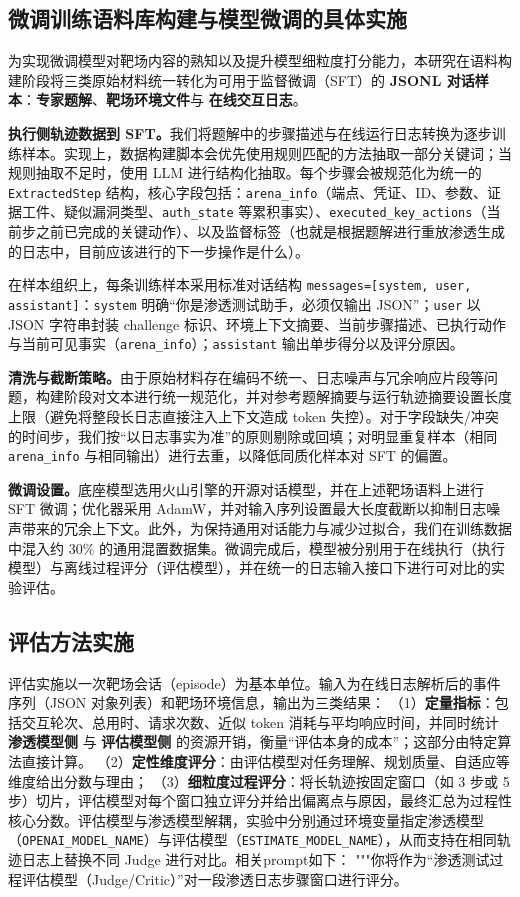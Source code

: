 \documentclass[a4paper, twocolumn]{article}
\begin{document}
\subsection{微调训练语料库构建与模型微调的具体实施}
为实现微调模型对靶场内容的熟知以及提升模型细粒度打分能力，本研究在语料构建阶段将三类原始材料统一转化为可用于监督微调（SFT）的 \textbf{JSONL 对话样本}：\textbf{专家题解}、\textbf{靶场环境文件}与 \textbf{在线交互日志}。

\textbf{执行侧轨迹数据到 SFT。}我们将题解中的步骤描述与在线运行日志转换为逐步训练样本。实现上，数据构建脚本会优先使用规则匹配的方法抽取一部分关键词；当规则抽取不足时，使用 LLM 进行结构化抽取。每个步骤会被规范化为统一的 \texttt{ExtractedStep} 结构，核心字段包括：\texttt{arena\_info}（端点、凭证、ID、参数、证据工件、疑似漏洞类型、\texttt{auth\_state} 等累积事实）、\texttt{executed\_key\_actions}（当前步之前已完成的关键动作）、以及监督标签（也就是根据题解进行重放渗透生成的日志中，目前应该进行的下一步操作是什么）。

在样本组织上，每条训练样本采用标准对话结构 \texttt{messages=[system, user, assistant]}：\texttt{system} 明确“你是渗透测试助手，必须仅输出 JSON”；\texttt{user} 以 JSON 字符串封装 challenge 标识、环境上下文摘要、当前步骤描述、已执行动作与当前可见事实（\texttt{arena\_info}）；\texttt{assistant} 输出单步得分以及评分原因。

\textbf{清洗与截断策略。}由于原始材料存在编码不统一、日志噪声与冗余响应片段等问题，构建阶段对文本进行统一规范化，并对参考题解摘要与运行轨迹摘要设置长度上限（避免将整段长日志直接注入上下文造成 token 失控）。对于字段缺失/冲突的时间步，我们按“以日志事实为准”的原则剔除或回填；对明显重复样本（相同 \texttt{arena\_info} 与相同输出）进行去重，以降低同质化样本对 SFT 的偏置。

\textbf{微调设置。}底座模型选用火山引擎的开源对话模型，并在上述靶场语料上进行 SFT 微调；优化器采用 AdamW，并对输入序列设置最大长度截断以抑制日志噪声带来的冗余上下文。此外，为保持通用对话能力与减少过拟合，我们在训练数据中混入约 30\% 的通用混置数据集。微调完成后，模型被分别用于在线执行（执行模型）与离线过程评分（评估模型），并在统一的日志输入接口下进行可对比的实验评估。

\subsection{评估方法实施}
评估实施以一次靶场会话（episode）为基本单位。输入为在线日志解析后的事件序列（JSON 对象列表）和靶场环境信息，输出为三类结果：
（1）\textbf{定量指标}：包括交互轮次、总用时、请求次数、近似 token 消耗与平均响应时间，并同时统计 \textbf{渗透模型侧} 与 \textbf{评估模型侧} 的资源开销，衡量“评估本身的成本”；这部分由特定算法直接计算。
（2）\textbf{定性维度评分}：由评估模型对任务理解、规划质量、自适应等维度给出分数与理由；
（3）\textbf{细粒度过程评分}：将长轨迹按固定窗口（如 3 步或 5 步）切片，评估模型对每个窗口独立评分并给出偏离点与原因，最终汇总为过程性核心分数。评估模型与渗透模型解耦，实验中分别通过环境变量指定渗透模型（\texttt{OPENAI\_MODEL\_NAME}）与评估模型（\texttt{ESTIMATE\_MODEL\_NAME}），从而支持在相同轨迹日志上替换不同 Judge 进行对比。相关prompt如下：
"""你将作为“渗透测试过程评估模型（Judge/Critic）”对一段渗透日志步骤窗口进行评分。
\end{document}
